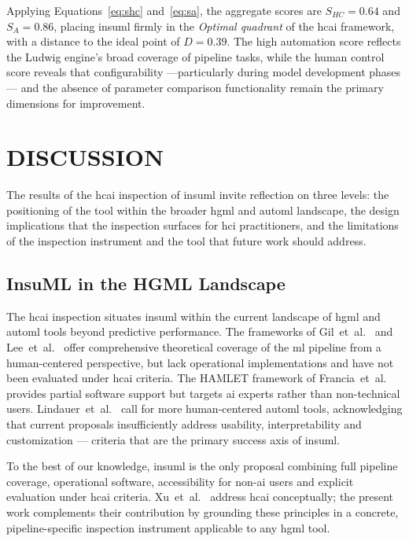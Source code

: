 \documentclass[a4paper,twoside]{article}
\begin{document}
Applying Equations~\ref{eq:shc} and~\ref{eq:sa}, the aggregate scores
are $S_{HC} = 0.64$ and $S_{A} = 0.86$, placing \gls{insuml} firmly in
the \emph{Optimal quadrant} of the \gls{hcai} framework, with a distance
to the ideal point of $D = 0.39$. The high automation score reflects the
Ludwig engine's broad coverage of pipeline tasks, while the human control
score reveals that configurability ---particularly during model development
phases--- and the absence of parameter comparison functionality remain the
primary dimensions for improvement.


\section{\uppercase{Discussion}}
\label{sec:discussion}

The results of the \gls{hcai} inspection of \gls{insuml} invite    
reflection on three levels: the positioning of the tool within the    
broader \gls{hgml} and \gls{automl} landscape, the design implications    
that the inspection surfaces for \gls{hci} practitioners, and the    
limitations of the inspection instrument and the tool that future work    
should address.

\subsection{InsuML in the HGML Landscape}

The \gls{hcai} inspection situates \gls{insuml} within the current
landscape of \gls{hgml} and \gls{automl} tools beyond predictive
performance. The frameworks of Gil~et~al.~\cite{gil2019towards} and
Lee~et~al.~\cite{lee2020human} offer comprehensive theoretical coverage
of the \gls{ml} pipeline from a human-centered perspective, but lack
operational implementations and have not been evaluated under \gls{hcai}
criteria. The HAMLET framework of Francia~et~al.~\cite{francia2023hamlet}
provides partial software support but targets \gls{ai} experts rather
than non-technical users. Lindauer~et~al.~\cite{lindauer2024position}
call for more human-centered \gls{automl} tools, acknowledging that
current proposals insufficiently address usability, interpretability and
customization --- criteria that are the primary success axis of \gls{insuml}.

To the best of our knowledge, \gls{insuml} is the only proposal combining
full pipeline coverage, operational software, accessibility for
non-\gls{ai} users and explicit evaluation under \gls{hcai} criteria.
Xu~et~al.~\cite{xu2026hcai} address \gls{hcai} conceptually; the present
work complements their contribution by grounding these principles in a
concrete, pipeline-specific inspection instrument applicable to any
\gls{hgml} tool.
\end{document}
